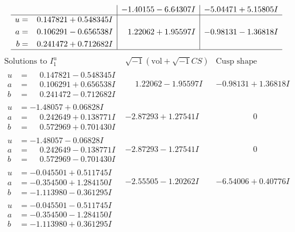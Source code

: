 \documentclass[1p]{elsarticle_modified}
\theoremstyle{definition}
\newcommand{\I}{\sqrt{-1}}
\begin{document}
$$\begin{array}{c|c|c}
 & -1.40155 - 6.64307 I & -5.04471 + 5.15805 I \\ \hline\begin{aligned}
u &= \phantom{-}0.147821 + 0.548345 I \\
a &= \phantom{-}0.106291 - 0.656538 I \\
b &= \phantom{-}0.241472 + 0.712682 I\end{aligned}
 & \phantom{-}1.22062 + 1.95597 I & -0.98131 - 1.36818 I\\
 \hline 
 \end{array}$$\newpage$$\begin{array}{c|c|c}  
\text{Solutions to }I^u_{1}& \I (\text{vol} + \sqrt{-1}CS) & \text{Cusp shape}\\
 \hline 
\begin{aligned}
u &= \phantom{-}0.147821 - 0.548345 I \\
a &= \phantom{-}0.106291 + 0.656538 I \\
b &= \phantom{-}0.241472 - 0.712682 I\end{aligned}
 & \phantom{-}1.22062 - 1.95597 I & -0.98131 + 1.36818 I \\ \hline\begin{aligned}
u &= -1.48057 + 0.06828 I \\
a &= \phantom{-}0.242649 + 0.138771 I \\
b &= \phantom{-}0.572969 + 0.701430 I\end{aligned}
 & -2.87293 + 1.27541 I & \phantom{-0.000000 } 0 \\ \hline\begin{aligned}
u &= -1.48057 - 0.06828 I \\
a &= \phantom{-}0.242649 - 0.138771 I \\
b &= \phantom{-}0.572969 - 0.701430 I\end{aligned}
 & -2.87293 - 1.27541 I & \phantom{-0.000000 } 0 \\ \hline\begin{aligned}
u &= -0.045501 + 0.511745 I \\
a &= -0.354500 + 1.284150 I \\
b &= -1.113980 - 0.361295 I\end{aligned}
 & -2.55505 - 1.20262 I & -6.54006 + 0.40776 I \\ \hline\begin{aligned}
u &= -0.045501 - 0.511745 I \\
a &= -0.354500 - 1.284150 I \\
b &= -1.113980 + 0.361295 I\end{aligned}

\end{array}$$
\end{document}
